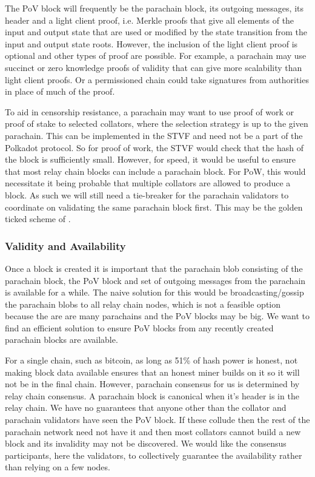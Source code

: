The PoV block will frequently be the parachain block, its outgoing messages, its header and a light client proof,
i.e. Merkle proofs that give all elements of the input and output state that are used or modified by the state transition from the input and output state roots.
However, the inclusion of the light client proof is optional and other types of proof are possible.
For example, a parachain may use succinct or zero knowledge proofs of validity that can give more scalability than light client proofs.
Or a permissioned chain could take signatures from authorities in place of much of the proof.

To aid in censorship resistance, a parachain may want to use proof of work or proof of stake to selected collators, where the selection strategy is up to the given parachain.
This can be implemented in the STVF and need not be a part of the Polkadot protocol. So for proof of work,
the STVF would check that the hash of the block is sufficiently small.
However, for speed, it would be useful to ensure that most relay chain blocks can include a parachain block.
For PoW, this would necessitate it being probable that multiple collators are allowed to produce a block.
As such we will still need a tie-breaker for the parachain validators to coordinate on validating the same parachain block first.
This may be the golden ticked scheme of \cite{2016:Wood:Polkadot}.


\subsubsection{Validity and Availability} \label{sec:validity-and-availability}
Once a block is created it is important that the parachain blob consisting of the parachain block, the PoV block and set of outgoing messages from the parachain is available for a while.
The naive solution for this would be broadcasting/gossip the parachain blobs to all relay chain nodes, which is not a feasible option because the are are many parachains and the PoV blocks may be big.
We want to find an efficient solution to ensure PoV blocks from any recently created parachain blocks are available.

For a single chain, such as bitcoin, as long as 51\% of hash power is honest, not making block data available ensures that an honest miner builds on it so it will not be in the final chain. However, parachain consensus for us is determined by relay chain consensus.
A parachain block is canonical when it's header is in the relay chain.
We have no guarantees that anyone other than the collator and parachain validators have seen the PoV block.
If these collude then the rest of the parachain network need not have it and then most collators cannot build a new block and its invalidity may not be discovered.
We would like the consensus participants, here the validators, to collectively guarantee the availability rather than relying on a few nodes.

